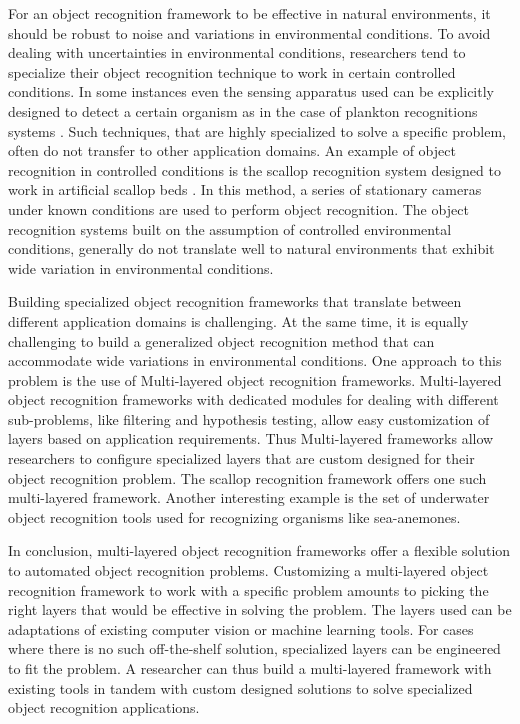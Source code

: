 For an object recognition framework to be effective in natural environments, it
should be robust to noise and variations in environmental conditions. 
To avoid dealing with uncertainties in environmental conditions, researchers tend to specialize their object recognition technique to work in certain controlled conditions. In some instances even the sensing apparatus used can be explicitly designed to detect a certain organism as in the case of plankton 
recognitions systems \cite{mcgavin_plankton, stelzer_rotifier}. 
Such techniques, that are highly specialized to solve a specific problem, 
often do not transfer to other application domains. An example of object recognition in controlled conditions is the scallop recognition system designed to work in artificial scallop beds \cite{enomoto9,enomoto10}. In this method, a series of stationary cameras under known conditions are used to perform object recognition. The object recognition systems built on the assumption of controlled environmental conditions, generally do not translate well to natural environments that exhibit wide variation in environmental conditions.

Building specialized object recognition frameworks that translate between different application domains is challenging. 
At the same time, it is equally challenging to build a generalized object recognition method that can accommodate wide variations in environmental conditions. 
One approach to this problem is the use of Multi-layered object recognition frameworks. Multi-layered object recognition frameworks with dedicated modules for dealing with different sub-problems, like filtering and hypothesis testing, allow easy customization of layers based on application requirements. 
Thus Multi-layered frameworks allow researchers to configure specialized layers that are custom designed for their object recognition problem. The scallop
recognition framework \cite{prasanna_aslo, prasanna_igi} offers one such multi-layered framework. Another interesting example is the set of underwater object recognition tools \cite{schoening} used for recognizing organisms like sea-anemones.

In conclusion, multi-layered object recognition frameworks offer a flexible solution to automated object recognition problems. Customizing a multi-layered object recognition framework to work with a specific problem amounts to picking the right layers that would be effective in solving the problem. The layers used can be adaptations of existing computer vision or machine learning tools. For cases where there is no such off-the-shelf solution, specialized layers can be engineered to fit the problem. A researcher can thus build a multi-layered framework with existing tools in tandem with custom designed solutions to solve specialized object recognition applications.

